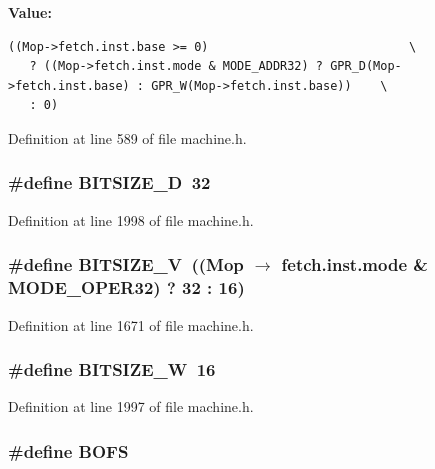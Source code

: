 \textbf{Value:}

\begin{Code}\begin{verbatim}((Mop->fetch.inst.base >= 0)                            \
   ? ((Mop->fetch.inst.mode & MODE_ADDR32) ? GPR_D(Mop->fetch.inst.base) : GPR_W(Mop->fetch.inst.base))    \
   : 0)
\end{verbatim}
\end{Code}


Definition at line 589 of file machine.h.
\subsubsection[{BITSIZE\_\-D}]{\setlength{\rightskip}{0pt plus 5cm}\#define BITSIZE\_\-D~32}\label{machine_8h_aac013556e6df9fb2044553652a9ee61}




Definition at line 1998 of file machine.h.
\subsubsection[{BITSIZE\_\-V}]{\setlength{\rightskip}{0pt plus 5cm}\#define BITSIZE\_\-V~((Mop $\rightarrow$ fetch.inst.mode \& MODE\_\-OPER32) ? 32 : 16)}\label{machine_8h_ee0629d912935d46433c67646c7eab2f}




Definition at line 1671 of file machine.h.
\subsubsection[{BITSIZE\_\-W}]{\setlength{\rightskip}{0pt plus 5cm}\#define BITSIZE\_\-W~16}\label{machine_8h_ebfa379bfea4866cadc65caf0f8d8477}




Definition at line 1997 of file machine.h.
\subsubsection[{BOFS}]{\setlength{\rightskip}{0pt plus 5cm}\#define BOFS}\label{machine_8h_00e73fd0ecd33e9e79cf4861ae3db648}


